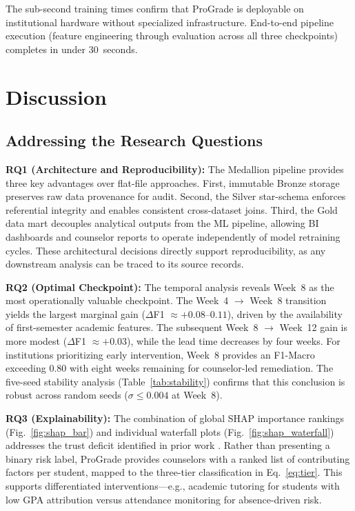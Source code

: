 \documentclass[conference,a4paper]{IEEEtran}
\begin{document}
The sub-second training times confirm that ProGrade is deployable on institutional hardware without specialized infrastructure. End-to-end pipeline execution (feature engineering through evaluation across all three checkpoints) completes in under 30~seconds.

\section{Discussion}\label{sec:discussion}

\subsection{Addressing the Research Questions}

\textbf{RQ1 (Architecture and Reproducibility):} The Medallion pipeline provides three key advantages over flat-file approaches. First, immutable Bronze storage preserves raw data provenance for audit. Second, the Silver star-schema enforces referential integrity and enables consistent cross-dataset joins. Third, the Gold data mart decouples analytical outputs from the ML pipeline, allowing BI dashboards and counselor reports to operate independently of model retraining cycles. These architectural decisions directly support reproducibility, as any downstream analysis can be traced to its source records.

\textbf{RQ2 (Optimal Checkpoint):} The temporal analysis reveals Week~8 as the most operationally valuable checkpoint. The Week~4 $\rightarrow$ Week~8 transition yields the largest marginal gain ($\Delta$F1 $\approx +0.08$--$0.11$), driven by the availability of first-semester academic features. The subsequent Week~8 $\rightarrow$ Week~12 gain is more modest ($\Delta$F1 $\approx +0.03$), while the lead time decreases by four weeks. For institutions prioritizing early intervention, Week~8 provides an F1-Macro exceeding 0.80 with eight weeks remaining for counselor-led remediation. The five-seed stability analysis (Table~\ref{tab:stability}) confirms that this conclusion is robust across random seeds ($\sigma \leq 0.004$ at Week~8).

\textbf{RQ3 (Explainability):} The combination of global SHAP importance rankings (Fig.~\ref{fig:shap_bar}) and individual waterfall plots (Fig.~\ref{fig:shap_waterfall}) addresses the trust deficit identified in prior work \cite{khosravi2022xaiedu}. Rather than presenting a binary risk label, ProGrade provides counselors with a ranked list of contributing factors per student, mapped to the three-tier classification in Eq.~\ref{eq:tier}. This supports differentiated interventions---e.g., academic tutoring for students with low GPA attribution versus attendance monitoring for absence-driven risk.
\end{document}
